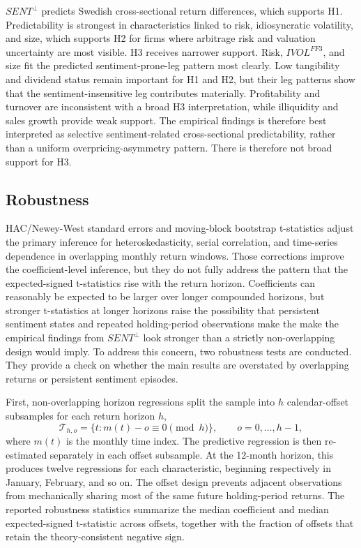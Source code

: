 \documentclass[11pt]{article}
\newcommand{\var}[1]{\ensuremath{#1}}
\begin{document}
\var{SENT^{\perp}} predicts Swedish cross-sectional return differences, which supports H1. Predictability is strongest in characteristics linked to risk, idiosyncratic volatility, and size, which supports H2 for firms where arbitrage risk and valuation uncertainty are most visible. H3 receives narrower support. Risk, \var{IVOL^{FF3}}, and size fit the predicted sentiment-prone-leg pattern most clearly. Low tangibility and dividend status remain important for H1 and H2, but their leg patterns show that the sentiment-insensitive leg contributes materially. Profitability and turnover are inconsistent with a broad H3 interpretation, while illiquidity and sales growth provide weak support. The empirical findings is therefore best interpreted as selective sentiment-related cross-sectional predictability, rather than a uniform overpricing-asymmetry pattern. There is therefore not broad support for H3.

\subsection{Robustness}
HAC/Newey-West standard errors and moving-block bootstrap t-statistics adjust the primary inference for heteroskedasticity, serial correlation, and time-series dependence in overlapping monthly return windows. Those corrections improve the coefficient-level inference, but they do not fully address the pattern that the expected-signed t-statistics rise with the return horizon. Coefficients can reasonably be expected to be larger over longer compounded horizons, but stronger t-statistics at longer horizons raise the possibility that persistent sentiment states and repeated holding-period observations make the make the empirical findings from \var{SENT^{\perp}} look stronger than a strictly non-overlapping design would imply. To address this concern, two robustness tests are conducted. They provide a check on whether the main results are overstated by overlapping returns or persistent sentiment episodes.

First, non-overlapping horizon regressions split the sample into \var{h} calendar-offset subsamples for each return horizon \var{h},
\begin{equation}
    \mathcal{T}_{h,o}=\{t: m(t)-o \equiv 0 \pmod h\}, \qquad o=0,\ldots,h-1,
\end{equation}
where \var{m(t)} is the monthly time index. The predictive regression is then re-estimated separately in each offset subsample. At the 12-month horizon, this produces twelve regressions for each characteristic, beginning respectively in January, February, and so on. The offset design prevents adjacent observations from mechanically sharing most of the same future holding-period returns. The reported robustness statistics summarize the median coefficient and median expected-signed t-statistic across offsets, together with the fraction of offsets that retain the theory-consistent negative sign.
\end{document}
